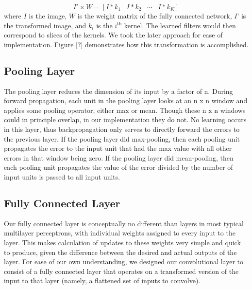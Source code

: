 \documentclass[10pt,twocolumn,letterpaper]{article}
\begin{document}
$$ I' \times W = [I*k_1 \hspace{10pt} I*k_2 \hspace{10pt} \cdots \hspace{10pt} I*k_K]$$
where $I$ is the image, $W$ is the weight matrix of the fully connected network, $I$’ is the transformed
image, and $k_i$ is the $i^{\text{th}}$ kernel. The learned filters would then correspond to slices of the kernels.
We took the later approach for ease of implementation. Figure [?] demonstrates how this transformation
is accomplished.


\subsection{Pooling Layer}

The pooling layer reduces the dimension of its input by a factor of n. During forward propagation, each
unit in the pooling layer looks at an n x n window and applies some pooling operator, either max or mean.
Though these n x n windows could in principle overlap, in our implementation they do not. No learning occurs
in this layer, thus backpropagation only serves to directly forward the errors to the previous layer.
If the pooling layer did max-pooling, then each pooling unit propagates the error to the input unit that
had the max value with all other errors in that window being zero. If the pooling layer did mean-pooling,
then each pooling unit propagates the value of the error divided by the number of input units is passed to all input units.


\subsection{Fully Connected Layer}
\label{sec:full}

Our fully connected layer is conceptually no different than layers in most typical multilayer
perceptrons, with individual weights assigned to every input to the layer.
This makes calculation of updates to these weights very simple and quick to produce, given the
difference between the desired and actual outputs of the layer.
For ease of our own understanding, we designed our convolutional layer to consist of a
fully connected layer that operates on a transformed version of the input to that layer
(namely, a flattened set of inputs to convolve).
\end{document}
